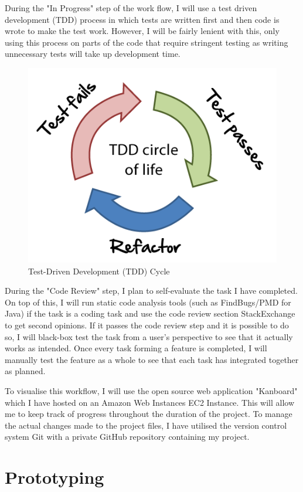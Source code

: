 \documentclass[]{report}
\begin{document}
	During the "In Progress" step of the work flow, I will use a test driven development (TDD) process in which tests are written first and then code is wrote to make the test work. However, I will be fairly lenient with this, only using this process on parts of the code that require stringent testing as writing unnecessary tests will take up development time. 
	\begin{figure}[H]
		\caption{
			Test-Driven Development (TDD) Cycle
			\cite{TDD Diagram}
		}
		\centering
		\includegraphics[scale=0.5]{tdd-circle-of-life.png}
	\end{figure}
	During the "Code Review" step, I plan to self-evaluate the task I have completed. On top of this, I will run static code analysis tools (such as FindBugs/PMD for Java) if the task is a coding task and use the code review section StackExchange to get second opinions. If it passes the code review step and it is possible to do so, I will black-box test the task from a user's perspective to see that it actually works as intended. Once every task forming a feature is completed, I will manually test the feature as a whole to see that each task has integrated together as planned.
	
	To visualise this workflow, I will use the open source web application "Kanboard" which I have hosted on an Amazon Web Instances EC2 Instance. This will allow me to keep track of progress throughout the duration of the project. To manage the actual changes made to the project files, I have utilised the version control system Git with a private GitHub repository containing my project.
	
	\chapter{Prototyping}
\end{document}
